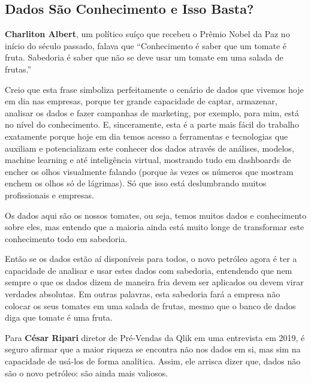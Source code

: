  \subsection{Dados São Conhecimento e Isso Basta?}
 
 \textbf{Charliton Albert}, um político suíço que recebeu o Prêmio Nobel da Paz no início do século passado, falava que “Conhecimento é saber que um tomate é fruta. Sabedoria é saber que não se deve usar um tomate em uma salada de frutas.”\vskip0.3cm 

Creio que esta frase simboliza perfeitamente o cenário de dados que vivemos hoje em dia nas empresas, porque ter grande capacidade de captar, armazenar, analisar os dados e fazer campanhas de marketing, por exemplo, para mim, está no nível do conhecimento. E, sinceramente, esta é a parte mais fácil do trabalho exatamente porque hoje em dia temos acesso a ferramentas e tecnologias que auxiliam e potencializam este conhecer dos dados através de análises, modelos, machine learning e até inteligência virtual, mostrando tudo em dashboards de encher os olhos visualmente falando (porque às vezes os números que mostram enchem os olhos só de lágrimas). Só que isso está deslumbrando muitos profissionais e empresas.\vskip0.3cm 


\newpage
Os dados aqui são os nossos tomates, ou seja, temos muitos dados e conhecimento sobre eles, mas entendo que a maioria ainda está muito longe de transformar este conhecimento todo em sabedoria.\vskip0.3cm 

Então se os dados estão aí disponíveis para todos, o novo petróleo agora é ter a capacidade de analisar e usar estes dados com sabedoria, entendendo que nem sempre o que os dados dizem de maneira fria devem ser aplicados ou devem virar verdades absolutas. Em outras palavras, esta sabedoria fará a empresa não colocar os seus tomates em uma salada de frutas, mesmo que o banco de dados diga que tomate é uma fruta.\vskip0.3cm 

Para \textbf{César Ripari} diretor de Pré-Vendas da Qlik em uma entrevista em 2019, é seguro afirmar que a maior riqueza se encontra não nos dados em si, mas sim na capacidade de usá-los de forma analítica. Assim, ele arrisca dizer que, dados não são o novo petróleo: são ainda mais valiosos.\vskip0.3cm 